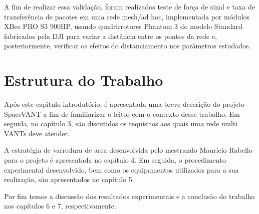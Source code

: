 A fim de realizar essa validação, foram realizados teste de força de sinal e taxa de transferência de pacotes em uma rede mesh/ad hoc, implementada por módulos XBee PRO S3 900HP, usando quadrirrotores Phantom 3 do modelo Standard fabricados pela DJI para variar a distância entre os pontos da rede e, posteriormente, verificar os efeitos do distanciamento nos parâmetros estudados.

\section{Estrutura do Trabalho}

Após este capitulo introdutório, é apresentada uma breve descrição do projeto SpaceVANT a fim de familiarizar o leitor com o contexto desse trabalho. Em seguida, no capítulo 3, são discutidos os requisitos aos quais uma rede multi VANTs deve atender. 

A estratégia de varredura de area desenvolvida pelo mestrando Maurício Rabello para o projeto é apresentada no capítulo 4. Em seguida, o procedimento experimental desenvolvido, bem como os equipamentos utilizados para a sua realização, são apresentados no capítulo 5.

Por fim temos a discussão dos resultados experimentais e a conclusão do trabalho nos capítulos 6 e 7, respectivamente.  